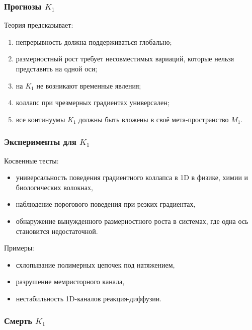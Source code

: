 \subsubsection{Прогнозы \texorpdfstring{$K_1$}{K_1}}

Теория предсказывает:
\begin{enumerate}
    \item непрерывность должна поддерживаться глобально;
    \item размерностный рост требует несовместимых вариаций, которые нельзя
          представить на одной оси;
    \item на $K_1$ не возникают временные явления;
    \item коллапс при чрезмерных градиентах универсален;
    \item все континуумы $K_1$ должны быть вложены в своё мета-пространство $M_1$.
\end{enumerate}

\subsubsection{Эксперименты для \texorpdfstring{$K_1$}{K_1}}

Косвенные тесты:
\begin{itemize}
    \item универсальность поведения градиентного коллапса в 1D в физике,
          химии и биологических волокнах,
    \item наблюдение порогового поведения при резких градиентах,
    \item обнаружение вынужденного размерностного роста в системах,
          где одна ось становится недостаточной.
\end{itemize}

Примеры:
\begin{itemize}
    \item схлопывание полимерных цепочек под натяжением,
    \item разрушение мемристорного канала,
    \item нестабильность 1D-каналов реакция-диффузии.
\end{itemize}

\subsubsection{Смерть \texorpdfstring{$K_1$}{K_1}}

